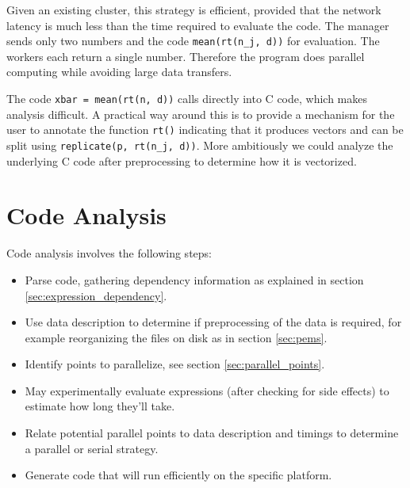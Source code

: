 \documentclass[12pt]{article}
\begin{document}
Given an existing cluster, this strategy is efficient, provided that the
network latency is much less than the time required to evaluate the code.
The manager sends only two numbers and the code \texttt{mean(rt(n\_j, d))}
for evaluation. The workers each return a single number. Therefore the
program does parallel computing while avoiding large data transfers. 


The code \texttt{xbar = mean(rt(n, d))} calls directly into C code, which
makes analysis difficult. A practical way around this is to provide a
mechanism for the user to annotate the function \texttt{rt()} indicating
that it produces vectors and can be split using \texttt{replicate(p,
rt(n\_j, d))}. More ambitiously we could analyze the underlying C code after
preprocessing to determine how it is vectorized.

\section{Code Analysis}

Code analysis involves the following steps:

\begin{itemize}
    \item Parse code, gathering dependency information as explained in
        section \ref{sec:expression_dependency}.

    \item Use data description to determine if preprocessing of the data is required, for example
        reorganizing the files on disk as in section \ref{sec:pems}.
    \item Identify points to parallelize, see section
        \ref{sec:parallel_points}.
    \item May experimentally evaluate expressions (after checking for side
        effects) to estimate how long they'll take.
    \item Relate potential parallel points to data description and timings
        to determine a parallel or serial strategy.
    \item Generate code that will run efficiently on the specific platform.
\end{itemize}
\end{document}
